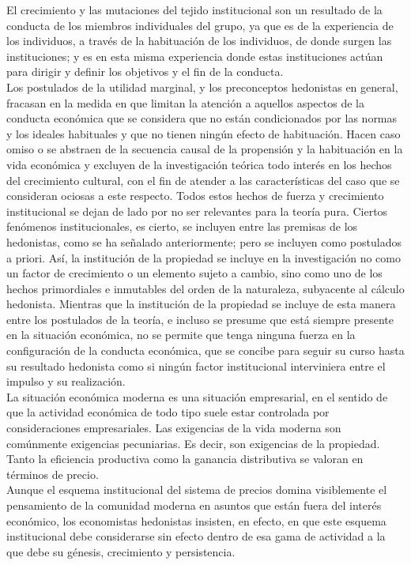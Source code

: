 El crecimiento y las mutaciones del tejido institucional son un resultado de la conducta de los miembros individuales del grupo, ya que es de la experiencia de los individuos, a través de la habituación de los individuos, de donde surgen las instituciones; y es en esta misma experiencia donde estas instituciones actúan para dirigir y definir los objetivos y el fin de la conducta. \\

Los postulados de la utilidad marginal, y los preconceptos hedonistas en general, fracasan en la medida en que limitan la atención a aquellos aspectos de la conducta económica que se considera que no están condicionados por las normas y los ideales habituales y que no tienen ningún efecto de habituación. Hacen caso omiso o se abstraen de la secuencia causal de la propensión y la habituación en la vida económica y excluyen de la investigación teórica todo interés en los hechos del crecimiento cultural, con el fin de atender a las características del caso que se consideran ociosas a este respecto. Todos estos hechos de fuerza y crecimiento institucional se dejan de lado por no ser relevantes para la teoría pura. Ciertos fenómenos institucionales, es cierto, se incluyen entre las premisas de los hedonistas, como se ha señalado anteriormente; pero se incluyen como postulados a priori. Así, la institución de la propiedad se incluye en la investigación no como un factor de crecimiento o un elemento sujeto a cambio, sino como uno de los hechos primordiales e inmutables del orden de la naturaleza, subyacente al cálculo hedonista.  Mientras que la institución de la propiedad se incluye de esta manera entre los postulados de la teoría, e incluso se presume que está siempre presente en la situación económica, no se permite que tenga ninguna fuerza en la configuración de la conducta económica, que se concibe para seguir su curso hasta su resultado hedonista como si ningún factor institucional interviniera entre el impulso y su realización.\\

La situación económica moderna es una situación empresarial, en el sentido de que la actividad económica de todo tipo suele estar controlada por consideraciones empresariales. Las exigencias de la vida moderna son comúnmente exigencias pecuniarias. Es decir, son exigencias de la propiedad. Tanto la eficiencia productiva como la ganancia distributiva se valoran en términos de precio. \\

Aunque el esquema institucional del sistema de precios domina visiblemente el pensamiento de la comunidad moderna en asuntos que están fuera del interés económico, los economistas hedonistas insisten, en efecto, en que este esquema institucional debe considerarse sin efecto dentro de esa gama de actividad a la que debe su génesis, crecimiento y persistencia.\\

